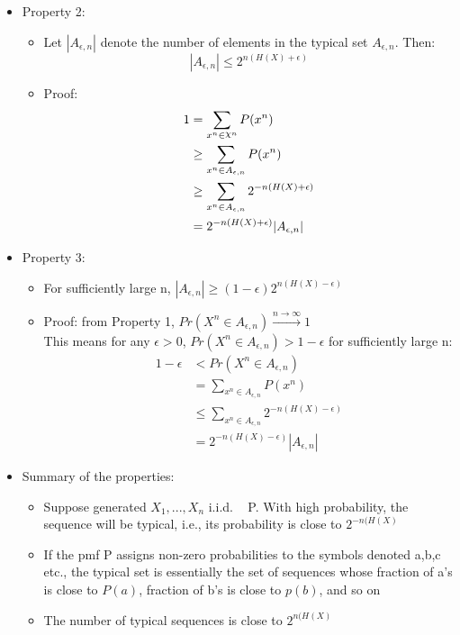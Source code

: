 \documentclass[24pt]{article}
\DeclareRobustCommand{\rchi}{{\mathpalette\irchi\relax}}
\newcommand{\irchi}[2]{\raisebox{\depth}{$#1\chi$}} %
\begin{document}
\begin{itemize}
\begin{itemize}
\begin{itemize}
\end{itemize}
\item Property 2:
\begin{itemize}
\item Let $|A_{\epsilon,n}|$ denote the number of elements in the typical set $A_{\epsilon,n}$. Then:
$$ |A_{\epsilon,n}| \le 2^{n(H(X)+\epsilon )}$$
\item Proof:
\begin{align*}
1  &= \sum_{x^n \in \rchi ^n }P(x^n) \\
 & \ge \sum_{x^n \in A_{\epsilon,n}} P(x^n)\\
 & \ge \sum_{x^n \in A_{\epsilon,n}} 2^{-n(H(X)+\epsilon)}\\
 & = 2^{-n(H(X)+\epsilon)} |A_{\epsilon,n}|\\
\end{align*}
\end{itemize}
\item Property 3:
\begin{itemize}
\item For sufficiently large n, $|A_{\epsilon,n}| \ge (1- \epsilon ) 2^{n(H(X)-\epsilon)}$
\item Proof: from Property 1, $ Pr(X^n \in A_{\epsilon,n}) \xrightarrow{n\rightarrow \infty} 1$ \\
This means for any $\epsilon > 0$,   $Pr(X^n \in A_{\epsilon,n}) > 1- \epsilon$ for sufficiently large n:
\begin{align*}
1 - \epsilon &< Pr(X^n \in A_{\epsilon,n})\\
&= \sum_{x^n \in A_{\epsilon,n}} P(x^n)\\
&\le \sum_{x^n \in A_{\epsilon,n}} 2^{-n(H(X)-\epsilon)}\\
&= 2^{-n(H(X)-\epsilon)} |A_{\epsilon,n}|
\end{align*}
\end{itemize}
\item Summary of the properties:
\begin{itemize}
\item Suppose generated $X_1,...,X_n$ i.i.d. ~ P. With high probability, the sequence will be typical, i.e., its probability is close to $2^{-n(H(X)}$
\item If the pmf P assigns non-zero probabilities to the symbols denoted a,b,c etc., the typical set is essentially the set of sequences whose fraction of a's is close to $P(a)$, fraction of b's is close to $p(b)$, and so on
\item The number of typical sequences is close to  $2^{n(H(X)}$
\end{itemize}
\end{itemize}
\end{itemize}
\end{document}
